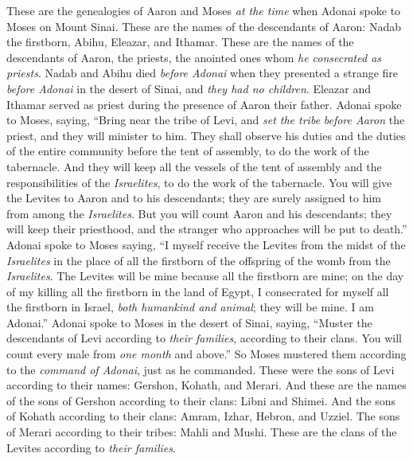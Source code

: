 \begin{biblechapter} %
 These are the genealogies of Aaron and Moses \textit{at the time} when Adonai spoke to Moses on Mount Sinai.
\verse These are the names of the descendants of Aaron: Nadab the firstborn, Abihu, Eleazar, and Ithamar.
\verse These are the names of the descendants of Aaron, the priests, the anointed ones whom \textit{he consecrated as priests}.
\verse Nadab and Abihu died \textit{before Adonai} when they presented a strange fire \textit{before Adonai} in the desert of Sinai, and \textit{they had no children}. Eleazar and Ithamar served as priest during the presence of Aaron their father.
\verse Adonai spoke to Moses, saying,
\verse “Bring near the tribe of Levi, and \textit{set the tribe} \textit{before Aaron} the priest, and they will minister to him.
\verse They shall observe his duties and the duties of the entire community before the tent of assembly, to do the work of the tabernacle.
\verse And they will keep all the vessels of the tent of assembly and the responsibilities of the \textit{Israelites}, to do the work of the tabernacle.
\verse You will give the Levites to Aaron and to his descendants; they are surely assigned to him from among the \textit{Israelites}.
\verse But you will count Aaron and his descendants; they will keep their priesthood, and the stranger who approaches will be put to death.”
\verse Adonai spoke to Moses saying,
\verse “I myself receive the Levites from the midst of the \textit{Israelites} in the place of all the firstborn of the offspring of the womb from the \textit{Israelites}. The Levites will be mine
\verse because all the firstborn are mine; on the day of my killing all the firstborn in the land of Egypt, I consecrated for myself all the firstborn in Israel, \textit{both humankind and animal}; they will be mine. I am Adonai.”
\verse Adonai spoke to Moses in the desert of Sinai, saying,
\verse “Muster the descendants of Levi according to \textit{their families}, according to their clans. You will count every male from \textit{one month} and above.”
\verse So Moses mustered them according to the \textit{command of Adonai}, just as he commanded.
\verse These were the sons of Levi according to their names: Gershon, Kohath, and Merari.
\verse And these are the names of the sons of Gershon according to their clans: Libni and Shimei.
\verse And the sons of Kohath according to their clans: Amram, Izhar, Hebron, and Uzziel.
\verse The sons of Merari according to their tribes: Mahli and Mushi. These are the clans of the Levites according to \textit{their families}.

\end{biblechapter}
